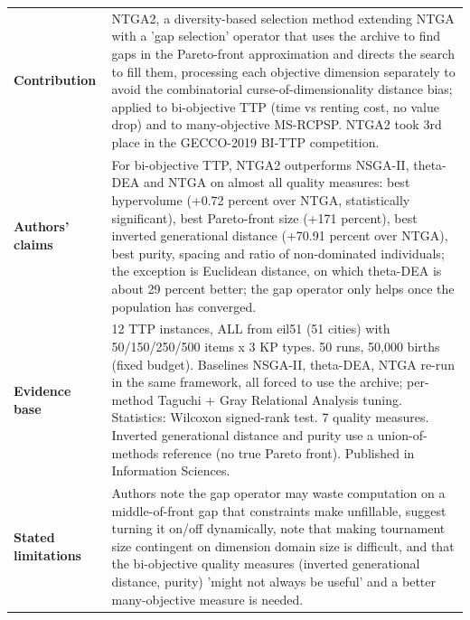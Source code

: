 \documentclass[
  a4paper,
  11pt,
  headings=small,
  numbers=noenddot,
  abstract=on,
  parskip=half,
]{scrartcl}
\begin{document}
\begin{landscape}
\begin{longtable}{@{}p{2.6cm}p{8.7cm}p{2.6cm}p{8.7cm}@{}}
\textbf{Contribution} & \multicolumn{3}{p{20.0cm}}{NTGA2, a diversity-based selection method extending NTGA with a 'gap selection' operator that uses the archive to find gaps in the Pareto-front approximation and directs the search to fill them, processing each objective dimension separately to avoid the combinatorial curse-of-dimensionality distance bias; applied to bi-objective TTP (time vs renting cost, no value drop) and to many-objective MS-RCPSP. NTGA2 took 3rd place in the GECCO-2019 BI-TTP competition.} \\
\textbf{Authors' claims} & \multicolumn{3}{p{20.0cm}}{For bi-objective TTP, NTGA2 outperforms NSGA-II, theta-DEA and NTGA on almost all quality measures: best hypervolume (+0.72 percent over NTGA, statistically significant), best Pareto-front size (+171 percent), best inverted generational distance (+70.91 percent over NTGA), best purity, spacing and ratio of non-dominated individuals; the exception is Euclidean distance, on which theta-DEA is about 29 percent better; the gap operator only helps once the population has converged.} \\
\textbf{Evidence base} & \multicolumn{3}{p{20.0cm}}{12 TTP instances, ALL from eil51 (51 cities) with 50/150/250/500 items x 3 KP types. 50 runs, 50,000 births (fixed budget). Baselines NSGA-II, theta-DEA, NTGA re-run in the same framework, all forced to use the archive; per-method Taguchi + Gray Relational Analysis tuning. Statistics: Wilcoxon signed-rank test. 7 quality measures. Inverted generational distance and purity use a union-of-methods reference (no true Pareto front). Published in Information Sciences.} \\
\textbf{Stated limitations} & \multicolumn{3}{p{20.0cm}}{Authors note the gap operator may waste computation on a middle-of-front gap that constraints make unfillable, suggest turning it on/off dynamically, note that making tournament size contingent on dimension domain size is difficult, and that the bi-objective quality measures (inverted generational distance, purity) 'might not always be useful' and a better many-objective measure is needed.} \\

\end{longtable}
\end{landscape}
\end{document}
